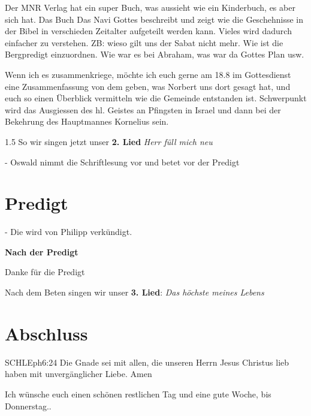 \begin{spacing}{1.5}
Der MNR Verlag hat ein super Buch, was aussieht wie ein Kinderbuch, es aber sich hat. Das Buch \glqq Das Navi Gottes \grqq{} beschreibt und zeigt wie die  Geschehnisse in der Bibel in verschieden Zeitalter aufgeteilt werden kann. Vieles wird dadurch einfacher zu verstehen. ZB: wieso gilt uns der Sabat nicht mehr. Wie ist die Bergpredigt einzuordnen. Wie war es bei Abraham, was war da Gottes Plan usw.

Wenn ich es zusammenkriege, möchte ich euch gerne am 18.8 im Gottesdienst eine Zusammenfassung von dem geben, was Norbert uns dort gesagt hat, und euch so einen Überblick vermitteln wie die Gemeinde entstanden ist. Schwerpunkt wird das Ausgiessen des hl. Geistes an Pfingsten in Israel und dann bei der Bekehrung des Hauptmannes Kornelius sein.


\end{spacing}{1.5}
So wir singen jetzt unser \textbf{2. Lied} \textit{Herr füll mich neu}

- Oswald nimmt die Schriftlesung vor und betet vor der Predigt

\section{Predigt}
- Die wird von Philipp verkündigt.

\textbf{Nach der Predigt}

Danke für die Predigt

Nach dem Beten singen wir unser \textbf{3. Lied}: \textit{Das höchste meines Lebens}\\

\section{Abschluss}

\begin{bibelbox}{SCHL}{Eph}{6:24}
Die Gnade sei mit allen, die unseren Herrn Jesus Christus lieb haben mit unvergänglicher Liebe. Amen
\end{bibelbox}

Ich wünsche euch einen schönen restlichen Tag und eine gute Woche, bis Donnerstag..
